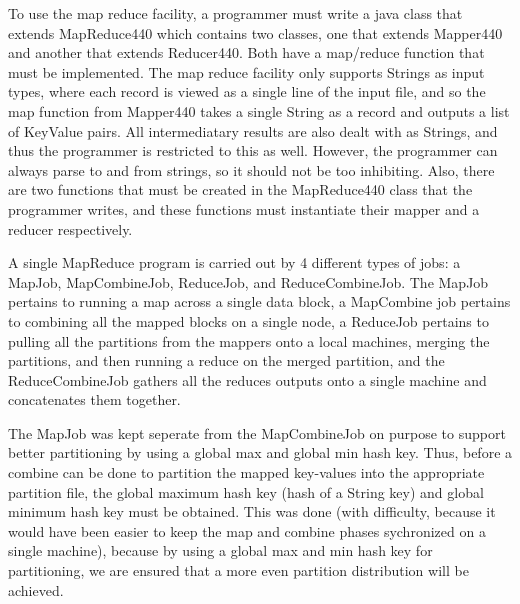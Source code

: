 \documentclass[11pt]{article}
\begin{document}
To use the map reduce facility, a programmer must write a java class that extends MapReduce440 which contains two classes, one that extends Mapper440 and another that extends Reducer440. Both have a map/reduce function that must be implemented. The map reduce facility only supports Strings as input types, where each record is viewed as a single line of the input file, and so the map function from Mapper440 takes a single String as a record and outputs a list of KeyValue pairs. All intermediatary results are also dealt with as Strings, and thus the programmer is restricted to this as well. However, the programmer can always parse to and from strings, so it should not be too inhibiting. Also, there are two functions that must be created in the MapReduce440 class that the programmer writes, and these functions must instantiate their mapper and a reducer respectively.

A single MapReduce program is carried out by 4 different types of jobs: a MapJob, MapCombineJob, ReduceJob, and ReduceCombineJob. The MapJob pertains to running a map across a single data block, a MapCombine job pertains to combining all the mapped blocks on a single node, a ReduceJob pertains to pulling all the partitions from the mappers onto a local machines, merging the partitions, and then running a reduce on the merged partition, and the ReduceCombineJob gathers all the reduces outputs onto a single machine and concatenates them together. 

The MapJob was kept seperate from the MapCombineJob on purpose to support better partitioning by using a global max and global min hash key. Thus, before a combine can be done to partition the mapped key-values into the appropriate partition file, the global maximum hash key (hash of a String key) and global minimum hash key must be obtained. This was done (with difficulty, because it would have been easier to keep the map and combine phases sychronized on a single machine), because by using a global max and min hash key for partitioning, we are ensured that a more even partition distribution will be achieved.
\end{document}
